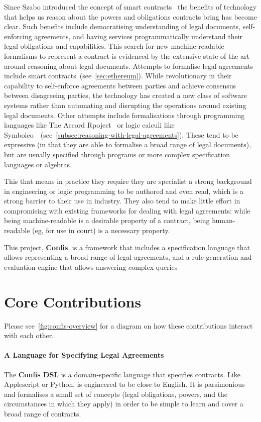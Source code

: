 Since Szabo introduced the concept of smart contracts~\cite{szabo1997smart-contracts} the benefits of technology that helps us reason about the powers and obligations contracts bring has become clear.
Such benefits include democratising understanding of legal documents, self-enforcing agreements, and having services programmatically understand their legal obligations and capabilities.
This search for new machine-readable formalisms to represent a contract is evidenced by the extensive state of the art around reasoning about legal documents.
Attempts to formalise legal agreements include smart contracts~(see~\autoref{sec:ethereum}).
While revolutionary in their capability to self-enforce agreements between parties and achieve consensus between disagreeing parties, the technology has created a new class of software systems rather than automating and disrupting the operations around existing legal documents.
Other attempts include formalisations through programming languages like The Accord Rpoject~\cite{accordHomepage} or logic calculi like Symboleo~\cite{symboleo2020}~(see~\autoref{subsec:reasoning-with-legal-agreements}).
These tend to be expressive (in that they are able to formalise a broad range of legal documents),
but are usually specified through programs or more complex specification languages or algebras.

This that means in practice they require they are specialist a strong background in engineering or logic programming to be authored and even read, which is a strong barrier to their use in industry.
They also tend to make little effort in compromising with existing frameworks for dealing with legal agreements: while being machine-readable is a desirable property of a contract, being human-readable (eg, for use in court) is a necessary property.



This project, \textbf{Confis}, is a framework that includes a specification language that allows representing a broad range of legal agreements, and
a
rule generation and evaluation engine that allows answering complex queries


\section*{Core Contributions}

Please see~\autoref{fig:confis-overview} for a diagram on how these contributions interact with each other.

\paragraph{A Language for Specifying Legal Agreements}
The \textbf{Confis DSL} is a domain-specific language that specifies contracts.
Like Applescript or Python, is engineered to be close to English.
It is parsimonious and formalises a small set of concepts (legal obligations, powers, and the circumstances in which they apply) in order to be simple to learn and cover a broad range of contracts.

